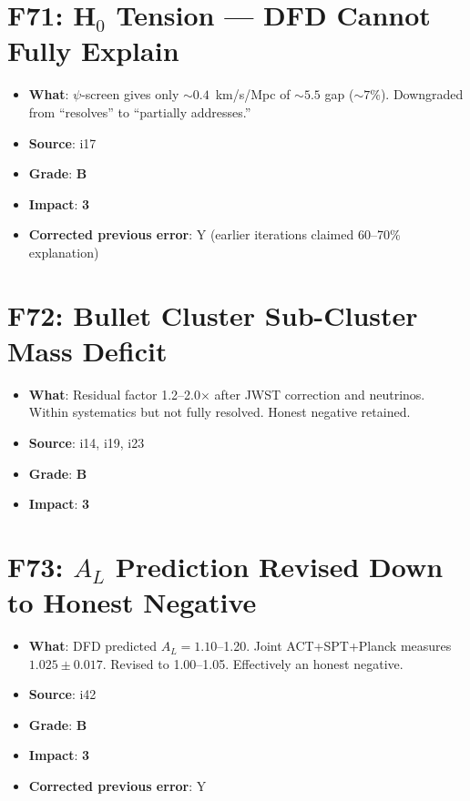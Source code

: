 \documentclass[11pt,a4paper]{article}
\newcommand{\grade}[1]{\textbf{#1}}
\newcommand{\impact}[1]{\textbf{#1}}
\begin{document}
\section{F71: H$_0$ Tension --- DFD Cannot Fully Explain}
\begin{itemize}[nosep]
\item \textbf{What}: $\psi$-screen gives only $\sim 0.4$~km/s/Mpc of $\sim 5.5$ gap ($\sim 7\%$). Downgraded from ``resolves'' to ``partially addresses.''
\item \textbf{Source}: i17
\item \textbf{Grade}: \grade{B}
\item \textbf{Impact}: \impact{3}
\item \textbf{Corrected previous error}: Y (earlier iterations claimed 60--70\% explanation)
\end{itemize}

\section{F72: Bullet Cluster Sub-Cluster Mass Deficit}
\begin{itemize}[nosep]
\item \textbf{What}: Residual factor 1.2--2.0$\times$ after JWST correction and neutrinos. Within systematics but not fully resolved. Honest negative retained.
\item \textbf{Source}: i14, i19, i23
\item \textbf{Grade}: \grade{B}
\item \textbf{Impact}: \impact{3}
\end{itemize}

\section{F73: $A_L$ Prediction Revised Down to Honest Negative}
\begin{itemize}[nosep]
\item \textbf{What}: DFD predicted $A_L = 1.10$--1.20. Joint ACT+SPT+Planck measures $1.025 \pm 0.017$. Revised to 1.00--1.05. Effectively an honest negative.
\item \textbf{Source}: i42
\item \textbf{Grade}: \grade{B}
\item \textbf{Impact}: \impact{3}
\item \textbf{Corrected previous error}: Y
\end{itemize}
\end{document}
